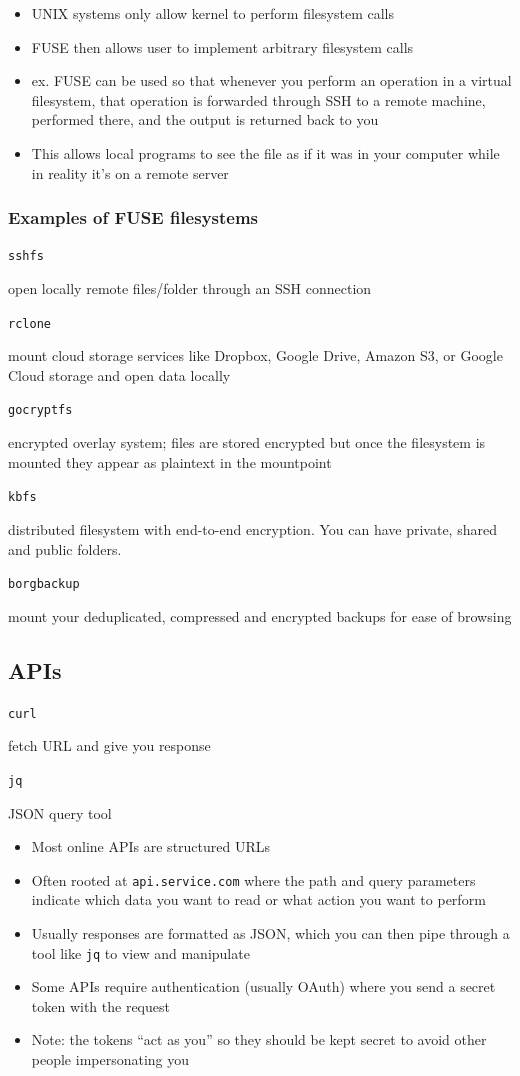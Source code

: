 \documentclass[letterpaper,12pt]{article}
\newcommand*{\lstitem}[1]{
  \setbox0\hbox{\lstinline{#1}}
  \item[\usebox0]
}
\begin{document}
\begin{itemize}
 \item UNIX systems only allow kernel to perform filesystem calls
 \item FUSE then allows user to implement arbitrary filesystem calls
 \item ex. FUSE can be used so that whenever you perform an operation in a virtual filesystem, that operation is forwarded through SSH to a remote machine, performed there, and the output is returned back to you
 \item This allows local programs to see the file as if it was in your computer while in reality it's on a remote server
\end{itemize}

\subsubsection{Examples of FUSE filesystems}
\begin{description}
 \lstitem{sshfs} open locally remote files/folder through an SSH connection
 \lstitem{rclone} mount cloud storage services like Dropbox, Google Drive, Amazon S3, or Google Cloud storage and open data locally
 \lstitem{gocryptfs} encrypted overlay system; files are stored encrypted but once the filesystem is mounted they appear as plaintext in the mountpoint
 \lstitem{kbfs} distributed filesystem with end-to-end encryption. You can have private, shared and public folders.
 \lstitem{borgbackup} mount your deduplicated, compressed and encrypted backups for ease of browsing
\end{description}

\subsection{APIs}
\begin{description}
 \lstitem{curl} fetch URL and give you response
 \lstitem{jq} JSON query tool
\end{description}
\begin{itemize}
 \item Most online APIs are structured URLs
 \item Often rooted at \lstinline{api.service.com} where the path and query parameters indicate which data you want to read or what action you want to perform
 \item Usually responses are formatted as JSON, which you can then pipe through a tool like \lstinline{jq} to view and manipulate
 \item Some APIs require authentication (usually OAuth) where you send a secret token with the request
 \item Note: the tokens ``act as you'' so they should be kept secret to avoid other people impersonating you
\end{itemize}
\end{document}

